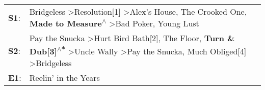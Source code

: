 \begin{supertabular}{p{0.03\textwidth}p{0.92\textwidth}}
 \textbf{S1}:  &                                                                Bridgeless\textsuperscript{} \textgreater \enspace Resolution[1]\textsuperscript{} \textgreater \enspace Alex's House\textsuperscript{}, \enspace The Crooked One\textsuperscript{}, \enspace \textbf{Made to Measure\textsuperscript{$\wedge$}} \textgreater \enspace Bad Poker\textsuperscript{}, \enspace Young Lust\textsuperscript{}  \enspace  \\
 \textbf{S2}:  &  Pay the Snucka\textsuperscript{} \textgreater \enspace Hurt Bird Bath[2]\textsuperscript{}, \enspace The Floor\textsuperscript{}, \enspace \textbf{Turn \& Dub[3]\textsuperscript{$\wedge$*}} \textgreater \enspace Uncle Wally\textsuperscript{} \textgreater \enspace Pay the Snucka\textsuperscript{}, \enspace Much Obliged[4]\textsuperscript{} \textgreater \enspace Bridgeless\textsuperscript{}  \enspace  \\
 \textbf{E1}:  &                                                                                                                                                                                                                                                                                                                                                                   Reelin' in the Years\textsuperscript{}  \enspace  \\
\end{supertabular}
